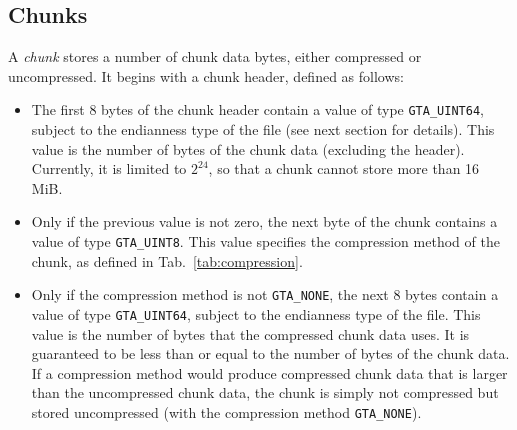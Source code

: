 \documentclass[a4paper,11pt]{article}
\newcommand{\code}[1]{\texttt{#1}}
\begin{document}
\subsection{Chunks}

A \emph{chunk} stores a number of chunk data bytes, either compressed or uncompressed.
It begins with a chunk header, defined as follows:
\begin{itemize}
\item The first 8 bytes of the chunk header contain a value of type \code{GTA\_UINT64},
subject to the endianness type of the file (see next section for details).
This value is the number of bytes of the chunk data (excluding the
header). Currently, it is limited to $2^24$, so that a chunk cannot store more
than 16 MiB.
\item Only if the previous value is not zero, the next byte of the chunk
contains a value of type \code{GTA\_UINT8}.  This value specifies the
compression method of the chunk, as defined in Tab.~\ref{tab:compression}.
\item Only if the compression method is not \code{GTA\_NONE}, the next 8 bytes
contain a value of type \code{GTA\_UINT64}, subject to the endianness type of
the file. This value is the number of bytes that the compressed chunk data
uses. It is guaranteed to be less than or equal to the number of bytes of the
chunk data. If a compression method would produce compressed chunk data that
is larger than the uncompressed chunk data, the chunk is simply not compressed
but stored uncompressed (with the compression method \code{GTA\_NONE}).
\end{itemize}
\end{document}
